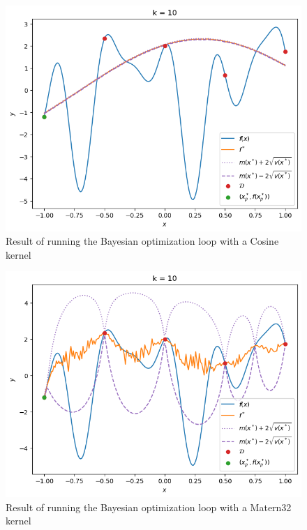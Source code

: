 \begin{figure}%
    \includegraphics[width=\textwidth]{figures/gp/cosine.png}
    \caption{Result of running the Bayesian optimization loop with a Cosine kernel}
\end{figure}

\begin{figure}%
    \includegraphics[width=\textwidth]{figures/gp/mattern.png}
    \caption{Result of running the Bayesian optimization loop with a Matern32 kernel}
\end{figure}